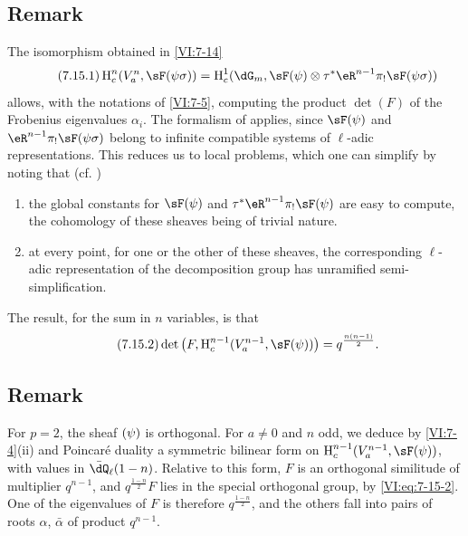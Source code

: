 




\subsection{Remark}\label{VI:7-15}

The isomorphism obtained in \ref{VI:7-14} 
\begin{equation*}\tag{7.15.1}\label{VI:eq:7-15-1}
  \h_c^n(V_a^n,\sF(\psi\sigma)) = \h_c^1(\dG_m,\sF(\psi)\otimes \tau^\ast \eR^{n-1} \pi_! \sF(\psi\sigma)) 
\end{equation*}
allows, with the notations of \ref{VI:7-5}, computing the product $\det(F)$
of the Frobenius eigenvalues $\alpha_i$. The formalism of \cite{de73}
applies, since $\sF(\psi)$ and $\eR^{n-1} \pi_! \sF(\psi\sigma)$
belong to infinite compatible systems of $\ell$-adic
representations. This reduces us to local problems, which one can
simplify by noting that (cf. \cite[9.5]{de73})
\begin{enumerate}[\indent a)]
  \item the global constants for
    $\sF(\psi)$ and $\tau^\ast \eR^{n-1} \pi_! \sF(\psi)$ are easy to
    compute, the cohomology of these sheaves being of trivial nature.
  \item at every point, for one or the other of these sheaves, the
    corresponding $\ell$-adic representation of the decomposition
    group has unramified semi-simplification.
\end{enumerate}

The result, for the sum in $n$ variables, is that 
\begin{equation*}\tag{7.15.2}\label{VI:eq:7-15-2}
  \det\left(F,\h_c^{n-1}(V_a^{n-1},\sF(\psi))\right) = q^{\frac{n(n-1)}{2}} \text{.} 
\end{equation*}





\subsection{Remark}\label{VI:7-16}

For $p=2$, the sheaf $\sf(\psi)$ is orthogonal. For $a\ne 0$ and $n$
odd, we deduce by \ref{VI:7-4}(ii) and Poincaré duality a
symmetric bilinear form on $\h_c^{n-1}(V_a^{n-1},\sF(\psi))$, with
values in $\bar\dQ_\ell(1-n)$. Relative to this form, $F$ is an
orthogonal similitude of multiplier $q^{n-1}$, and $q^{\frac{1-n}{2}} F$
lies in the special orthogonal group, by \eqref{VI:eq:7-15-2}. One
of the eigenvalues of $F$ is therefore $q^{\frac{1-n}{2}}$, and the others fall
into pairs of roots $\alpha$, $\bar\alpha$ of product $q^{n-1}$.

